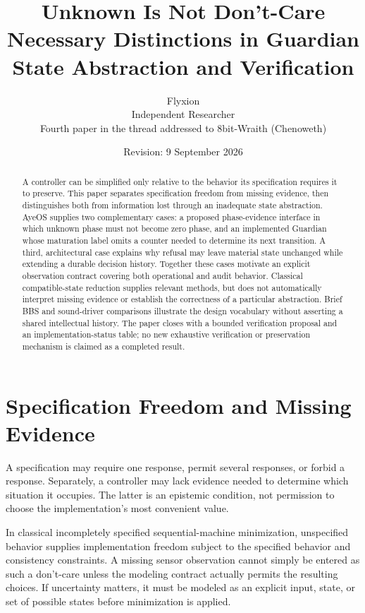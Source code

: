 \documentclass[11pt]{article}
\title{\textbf{Unknown Is Not Don't-Care}\\[4pt]
\large Necessary Distinctions in Guardian State Abstraction and Verification}
\author{Flyxion\\\small Independent Researcher\\
\small Fourth paper in the thread addressed to 8bit-Wraith (Chenoweth)}
\date{Revision: 9 September 2026}
\begin{document}
\maketitle
\begin{abstract}
A controller can be simplified only relative to the behavior its specification requires it to preserve. This paper separates specification freedom from missing evidence, then distinguishes both from information lost through an inadequate state abstraction. AyeOS supplies two complementary cases: a proposed phase-evidence interface in which unknown phase must not become zero phase, and an implemented Guardian whose maturation label omits a counter needed to determine its next transition. A third, architectural case explains why refusal may leave material state unchanged while extending a durable decision history. Together these cases motivate an explicit observation contract covering both operational and audit behavior. Classical compatible-state reduction supplies relevant methods, but does not automatically interpret missing evidence or establish the correctness of a particular abstraction. Brief BBS and sound-driver comparisons illustrate the design vocabulary without asserting a shared intellectual history. The paper closes with a bounded verification proposal and an implementation-status table; no new exhaustive verification or preservation mechanism is claimed as a completed result.
\end{abstract}

\section{Specification Freedom and Missing Evidence}
A specification may require one response, permit several responses, or forbid a response. Separately, a controller may lack evidence needed to determine which situation it occupies. The latter is an epistemic condition, not permission to choose the implementation's most convenient value.

In classical incompletely specified sequential-machine minimization, unspecified behavior supplies implementation freedom subject to the specified behavior and consistency constraints. A missing sensor observation cannot simply be entered as such a don't-care unless the modeling contract actually permits the resulting choices. If uncertainty matters, it must be modeled as an explicit input, state, or set of possible states before minimization is applied.
\end{document}
